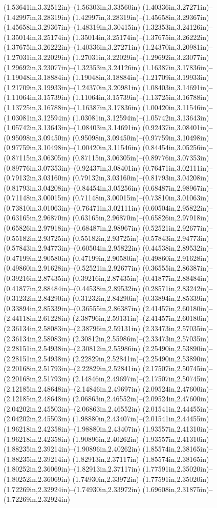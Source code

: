 (1.53641in,3.32512in)--(1.56303in,3.33560in) (1.40336in,3.27271in)--(1.42997in,3.28319in) (1.42997in,3.28319in)--(1.45658in,3.29367in) (1.45658in,3.29367in)--(1.48319in,3.30415in) (1.32353in,3.24126in)--(1.35014in,3.25174in) (1.35014in,3.25174in)--(1.37675in,3.26222in) (1.37675in,3.26222in)--(1.40336in,3.27271in) (1.24370in,3.20981in)--(1.27031in,3.22029in) (1.27031in,3.22029in)--(1.29692in,3.23077in) (1.29692in,3.23077in)--(1.32353in,3.24126in) (1.16387in,3.17836in)--(1.19048in,3.18884in) (1.19048in,3.18884in)--(1.21709in,3.19933in) (1.21709in,3.19933in)--(1.24370in,3.20981in) (1.08403in,3.14691in)--(1.11064in,3.15739in) (1.11064in,3.15739in)--(1.13725in,3.16788in) (1.13725in,3.16788in)--(1.16387in,3.17836in) (1.00420in,3.11546in)--(1.03081in,3.12594in) (1.03081in,3.12594in)--(1.05742in,3.13643in) (1.05742in,3.13643in)--(1.08403in,3.14691in) (0.92437in,3.08401in)--(0.95098in,3.09450in) (0.95098in,3.09450in)--(0.97759in,3.10498in) (0.97759in,3.10498in)--(1.00420in,3.11546in) (0.84454in,3.05256in)--(0.87115in,3.06305in) (0.87115in,3.06305in)--(0.89776in,3.07353in) (0.89776in,3.07353in)--(0.92437in,3.08401in) (0.76471in,3.02111in)--(0.79132in,3.03160in) (0.79132in,3.03160in)--(0.81793in,3.04208in) (0.81793in,3.04208in)--(0.84454in,3.05256in) (0.68487in,2.98967in)--(0.71148in,3.00015in) (0.71148in,3.00015in)--(0.73810in,3.01063in) (0.73810in,3.01063in)--(0.76471in,3.02111in) (0.60504in,2.95822in)--(0.63165in,2.96870in) (0.63165in,2.96870in)--(0.65826in,2.97918in) (0.65826in,2.97918in)--(0.68487in,2.98967in) (0.52521in,2.92677in)--(0.55182in,2.93725in) (0.55182in,2.93725in)--(0.57843in,2.94773in) (0.57843in,2.94773in)--(0.60504in,2.95822in) (0.44538in,2.89532in)--(0.47199in,2.90580in) (0.47199in,2.90580in)--(0.49860in,2.91628in) (0.49860in,2.91628in)--(0.52521in,2.92677in) (0.36555in,2.86387in)--(0.39216in,2.87435in) (0.39216in,2.87435in)--(0.41877in,2.88484in) (0.41877in,2.88484in)--(0.44538in,2.89532in) (0.28571in,2.83242in)--(0.31232in,2.84290in) (0.31232in,2.84290in)--(0.33894in,2.85339in) (0.33894in,2.85339in)--(0.36555in,2.86387in) (2.41457in,2.60180in)--(2.44118in,2.61228in) (2.38796in,2.59131in)--(2.41457in,2.60180in) (2.36134in,2.58083in)--(2.38796in,2.59131in) (2.33473in,2.57035in)--(2.36134in,2.58083in) (2.30812in,2.55986in)--(2.33473in,2.57035in) (2.28151in,2.54938in)--(2.30812in,2.55986in) (2.25490in,2.53890in)--(2.28151in,2.54938in) (2.22829in,2.52841in)--(2.25490in,2.53890in) (2.20168in,2.51793in)--(2.22829in,2.52841in) (2.17507in,2.50745in)--(2.20168in,2.51793in) (2.14846in,2.49697in)--(2.17507in,2.50745in) (2.12185in,2.48648in)--(2.14846in,2.49697in) (2.09524in,2.47600in)--(2.12185in,2.48648in) (2.06863in,2.46552in)--(2.09524in,2.47600in) (2.04202in,2.45503in)--(2.06863in,2.46552in) (2.01541in,2.44455in)--(2.04202in,2.45503in) (1.98880in,2.43407in)--(2.01541in,2.44455in) (1.96218in,2.42358in)--(1.98880in,2.43407in) (1.93557in,2.41310in)--(1.96218in,2.42358in) (1.90896in,2.40262in)--(1.93557in,2.41310in) (1.88235in,2.39214in)--(1.90896in,2.40262in) (1.85574in,2.38165in)--(1.88235in,2.39214in) (1.82913in,2.37117in)--(1.85574in,2.38165in) (1.80252in,2.36069in)--(1.82913in,2.37117in) (1.77591in,2.35020in)--(1.80252in,2.36069in) (1.74930in,2.33972in)--(1.77591in,2.35020in) (1.72269in,2.32924in)--(1.74930in,2.33972in) (1.69608in,2.31875in)--(1.72269in,2.32924in) 